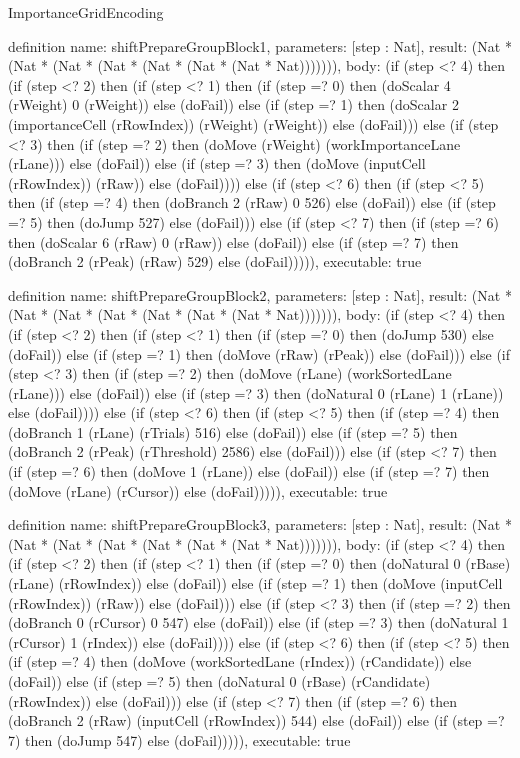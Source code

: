 \begin{lexlean}{ImportanceGridEncoding}
\begin{semanticmodule}
definition{
  name: shiftPrepareGroupBlock1,
  parameters: [step : Nat],
  result: (Nat * (Nat * (Nat * (Nat * (Nat * (Nat * (Nat * Nat))))))),
  body: (if (step <? 4) then
      (if (step <? 2) then
      (if (step <? 1) then
      (if (step =? 0) then (doScalar 4 (rWeight) 0 (rWeight)) else (doFail)) else
      (if (step =? 1) then (doScalar 2 (importanceCell (rRowIndex)) (rWeight) (rWeight)) else (doFail))) else
      (if (step <? 3) then
      (if (step =? 2) then (doMove (rWeight) (workImportanceLane (rLane))) else (doFail)) else
      (if (step =? 3) then (doMove (inputCell (rRowIndex)) (rRaw)) else (doFail)))) else
      (if (step <? 6) then
      (if (step <? 5) then
      (if (step =? 4) then (doBranch 2 (rRaw) 0 526) else (doFail)) else
      (if (step =? 5) then (doJump 527) else (doFail))) else
      (if (step <? 7) then
      (if (step =? 6) then (doScalar 6 (rRaw) 0 (rRaw)) else (doFail)) else
      (if (step =? 7) then (doBranch 2 (rPeak) (rRaw) 529) else (doFail))))),
  executable: true
}

definition{
  name: shiftPrepareGroupBlock2,
  parameters: [step : Nat],
  result: (Nat * (Nat * (Nat * (Nat * (Nat * (Nat * (Nat * Nat))))))),
  body: (if (step <? 4) then
      (if (step <? 2) then
      (if (step <? 1) then
      (if (step =? 0) then (doJump 530) else (doFail)) else
      (if (step =? 1) then (doMove (rRaw) (rPeak)) else (doFail))) else
      (if (step <? 3) then
      (if (step =? 2) then (doMove (rLane) (workSortedLane (rLane))) else (doFail)) else
      (if (step =? 3) then (doNatural 0 (rLane) 1 (rLane)) else (doFail)))) else
      (if (step <? 6) then
      (if (step <? 5) then
      (if (step =? 4) then (doBranch 1 (rLane) (rTrials) 516) else (doFail)) else
      (if (step =? 5) then (doBranch 2 (rPeak) (rThreshold) 2586) else (doFail))) else
      (if (step <? 7) then
      (if (step =? 6) then (doMove 1 (rLane)) else (doFail)) else
      (if (step =? 7) then (doMove (rLane) (rCursor)) else (doFail))))),
  executable: true
}

definition{
  name: shiftPrepareGroupBlock3,
  parameters: [step : Nat],
  result: (Nat * (Nat * (Nat * (Nat * (Nat * (Nat * (Nat * Nat))))))),
  body: (if (step <? 4) then
      (if (step <? 2) then
      (if (step <? 1) then
      (if (step =? 0) then (doNatural 0 (rBase) (rLane) (rRowIndex)) else (doFail)) else
      (if (step =? 1) then (doMove (inputCell (rRowIndex)) (rRaw)) else (doFail))) else
      (if (step <? 3) then
      (if (step =? 2) then (doBranch 0 (rCursor) 0 547) else (doFail)) else
      (if (step =? 3) then (doNatural 1 (rCursor) 1 (rIndex)) else (doFail)))) else
      (if (step <? 6) then
      (if (step <? 5) then
      (if (step =? 4) then (doMove (workSortedLane (rIndex)) (rCandidate)) else (doFail)) else
      (if (step =? 5) then (doNatural 0 (rBase) (rCandidate) (rRowIndex)) else (doFail))) else
      (if (step <? 7) then
      (if (step =? 6) then (doBranch 2 (rRaw) (inputCell (rRowIndex)) 544) else (doFail)) else
      (if (step =? 7) then (doJump 547) else (doFail))))),
  executable: true
}


\end{semanticmodule}
\end{lexlean}

